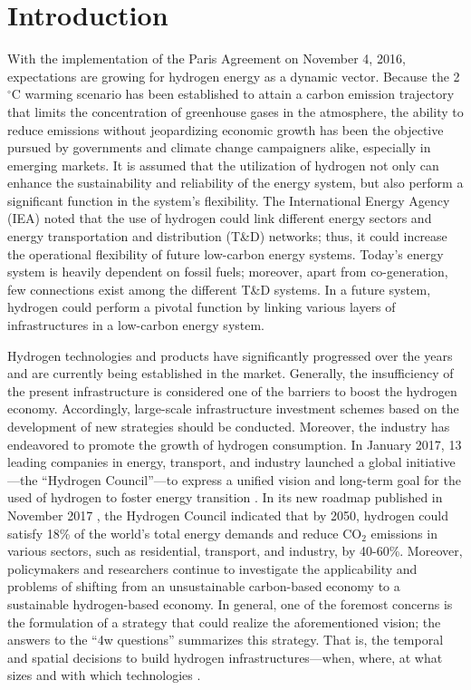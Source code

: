 \documentclass[11pt,3p]{elsarticle}
\begin{document}

\section{Introduction}
\label{sec:intro}

With the implementation of the Paris Agreement on November 4, 2016, expectations are growing for hydrogen energy as a dynamic vector. Because the 2$^\circ$C warming scenario has been established to attain a carbon emission trajectory that limits the concentration of greenhouse gases in the atmosphere, the ability to reduce emissions without jeopardizing economic growth has been the objective pursued by governments and climate change campaigners alike, especially in emerging markets. It is assumed that the utilization of hydrogen not only can enhance the sustainability and reliability of the energy system, but also perform a significant function in the system's flexibility. The International Energy Agency (IEA) \citep{iea2015technology} noted that the use of hydrogen could link different energy sectors and energy transportation and distribution (T\&D) networks; thus, it could increase the operational flexibility of future low-carbon energy systems. Today's energy system is heavily dependent on fossil fuels; moreover, apart from co-generation, few connections exist among the different T\&D systems. In a future system, hydrogen could perform a pivotal function by linking various layers of infrastructures in a low-carbon energy system.

Hydrogen technologies and products have significantly progressed over the years and are currently being established in the market. Generally, the insufficiency of the present infrastructure is considered one of the barriers to boost the hydrogen economy. Accordingly, large-scale infrastructure investment schemes based on the development of new strategies should be conducted. Moreover, the industry has endeavored to promote the growth of hydrogen consumption. In January 2017, 13 leading companies in energy, transport, and industry launched a global initiative---the ``Hydrogen Council''---to express a unified vision and long-term goal for the used of hydrogen to foster energy transition \citep{Hydrogen}. In its new roadmap published in November 2017 \citep{HydrogenCouncil2017}, the Hydrogen Council indicated that by 2050, hydrogen could satisfy 18\% of the world's total energy demands and reduce CO$_{2}$ emissions in various sectors, such as residential, transport, and industry, by 40-60\%. Moreover, policymakers and researchers continue to investigate the applicability and problems of shifting from an unsustainable carbon-based economy to a sustainable hydrogen-based economy. In general, one of the foremost concerns is the formulation of a strategy that could realize the aforementioned vision; the answers to the ``4w questions'' summarizes this strategy. That is, the temporal and spatial decisions to build hydrogen infrastructures---when, where, at what sizes and with which technologies \citep{lin2008least}.
\end{document}
